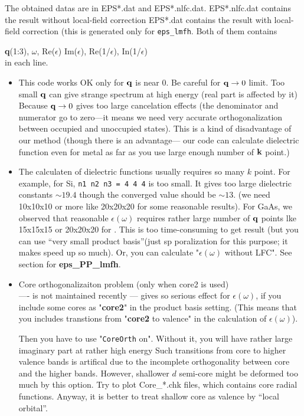 \documentclass[a4paper,10pt,epsf,fleqn]{article}
\newcommand{\keyw}[1]{\fbox{\tt #1}}
\newcommand{\exe}[1]{{\bf #1}}
\newcommand{\io}[1]{{\sf  #1}}
\newcommand{\raw}[1]{{\tt #1}}
\begin{document}
The obtained datas are in {\sf EPS*.dat} and {\sf EPS*.nlfc.dat}.
{\sf EPS*.nlfc.dat} contains the result without local-field correction
{\sf EPS*.dat} contains the result with local-field correction
(this is generated only for \verb#eps_lmfh#. Both of them contains

{\bf q}(1:3), $\omega$, Re($\epsilon$) Im($\epsilon$), Re(1/$\epsilon$), In(1/$\epsilon$)\\
in each line.

\begin{screen}
\begin{itemize}
 \item 
This code works OK only for ${\bf q}$ is near 0.
Be careful for ${\bf q} \to 0$ limit. Too small ${\bf q}$ can give strange
spectrum at high energy (real part is affected by it)\\

Because ${\bf q} \to 0$ gives too large cancelation effects
(the denominator and numerator go to zero---it means we need very accurate
orthogonalization between occupied and unoccupied states).
This is a kind of disadvantage of our method (though there is an advantage---
our code can calculate dielectric function even for metal 
as far as you use large enough number of ${\bf k}$ point.)

\item
The calculaten of dielectric functions usually requires so many $k$ point. 
For example, for Si,  \verb#n1 n2 n3 = 4 4 4# is too small. 
It gives too large dielectric constants $\sim19.4$ though
the converged value should be $\sim13$. (we need 10x10x10 or more like 20x20x20
for some reasonable results).
For GaAs, we observed that reasonable $\epsilon(\omega)$ requires
rather large number of ${\bf q}$ points lke 15x15x15 or 20x20x20
for \keyw{n1n2n3}. This is too time-consuming to get result
(but you can use ``very small product basis''(just sp poralization for this purpose;
it makes speed up so much). Or, you can calculate "$\epsilon(\omega)$ without LFC". 
See section for \exe{eps\_PP\_lmfh}.

\item Core orthogonalizaiton problem (only when core2 is used)\\
----\keyw{CoreOrth} is not maintained recently ---
 \keyw{CoreOrth} gives so serious effect for 
$\epsilon(\omega)$, if you include some cores as "{\bf core2}"
in the product basis setting.
(This means that you includes transtions from "{\bf core2} to
valence" in the calculation of $\epsilon(\omega)$).

Then you have to use "\raw{CoreOrth} on". Without it,
you will have rather large imaginary part at rather high energy
Such transitions from core to higher valence bands
is artifical due to the incomplete orthogonality
between core and the higher bands.
However, shallower $d$ semi-core might be deformed too much
by this option. Try to plot \io{Core\_*.chk} files, 
which contains core radial functions. 
Anyway, it is better to treat shallow core as valence by ``local orbital''.
\end{itemize}
\end{screen}
\end{document}
